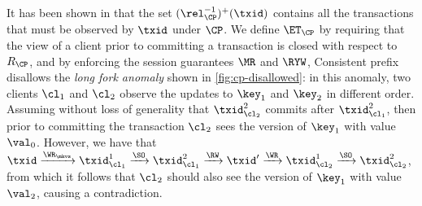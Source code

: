 It has been shown in \cite{laws} 
that the set $(\rel_{\CP}^{-1})^{+}(\txid)$ contains all the transactions that {must} be observed by $\txid$ under 
$\CP$. We define $\ET_{\CP}$ by requiring that the view of a client prior to committing a transaction is 
closed with respect to $R_{\CP}$, and by enforcing the session guarantees $\MR$ and $\RYW$,
Consistent prefix disallows the \emph{long fork anomaly} shown in \cref{fig:cp-disallowed}: 
in this anomaly, two clients $\cl_1$ and $\cl_2$ observe the updates to $\key_1$ and $\key_2$ 
in different order. Assuming without loss of generality that \( \txid_{\cl_2}^{2} \) commits 
after \( \txid_{\cl_1}^{2} \), then prior to committing the transaction $\cl_2$ sees 
the version of $\key_1$ with value $\val_0$. However, we have that $\txid \xrightarrow{\WR_{\mkvs}} \txid_{\cl_{1}}^{1} 
\xrightarrow{\SO} \txid_{\cl_{1}}^{2} \xrightarrow{\RW} \txid' \xrightarrow{\WR} \txid_{\cl_{2}}^{1} \xrightarrow{\SO} 
\txid_{\cl_2}^{2}$, from which it follows that $\cl_2$ should also see the version of $\key_1$ with 
value $\val_2$, causing a contradiction.


